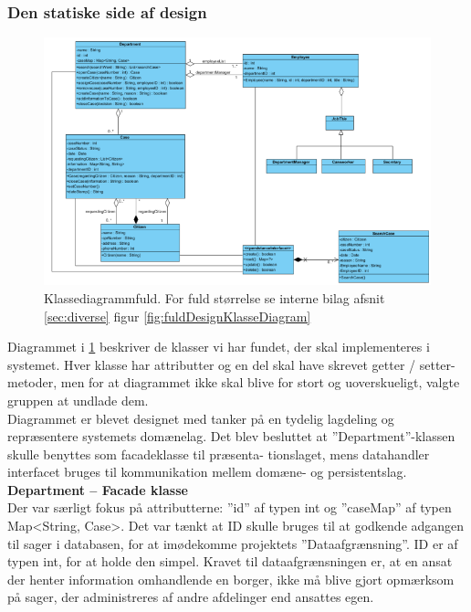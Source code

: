 \subsubsection{Den statiske side af design}
\begin{figure}[h]
\includegraphics[width = \linewidth]{./PNG/design/fulddesignklassediagram.PNG}
\caption{Klassediagrammfuld. For fuld størrelse se interne bilag afsnit \ref{sec:diverse} figur \ref{fig:fuldDesignKlasseDiagram}}
\label{fig:desginklasse}
\end{figure}
Diagrammet i \ref{fig:desginklasse} beskriver de klasser vi har fundet, der skal implementeres i systemet. Hver klasse har attributter og en del skal have skrevet getter / setter-metoder, men for at diagrammet ikke skal blive for stort og uoverskueligt, valgte gruppen at undlade dem.\\
Diagrammet er blevet designet med tanker på en tydelig lagdeling og repræsentere systemets domænelag. Det blev besluttet at ”Department”-klassen skulle benyttes som facadeklasse til præsenta- tionslaget, mens datahandler interfacet bruges til kommunikation mellem domæne- og persistentslag.\\
\textbf{Department – Facade klasse}\\
Der var særligt fokus på attributterne: ”id” af typen int og ”caseMap” af typen Map\textless String, Case\textgreater . Det var tænkt at ID skulle bruges til at godkende adgangen til sager i databasen, for at imødekomme projektets ”Dataafgrænsning”. ID er af typen int, for at holde den simpel. Kravet til dataafgrænsningen er, at en ansat der henter information omhandlende en borger, ikke må blive gjort opmærksom på sager, der administreres af andre afdelinger end ansattes egen.\\
